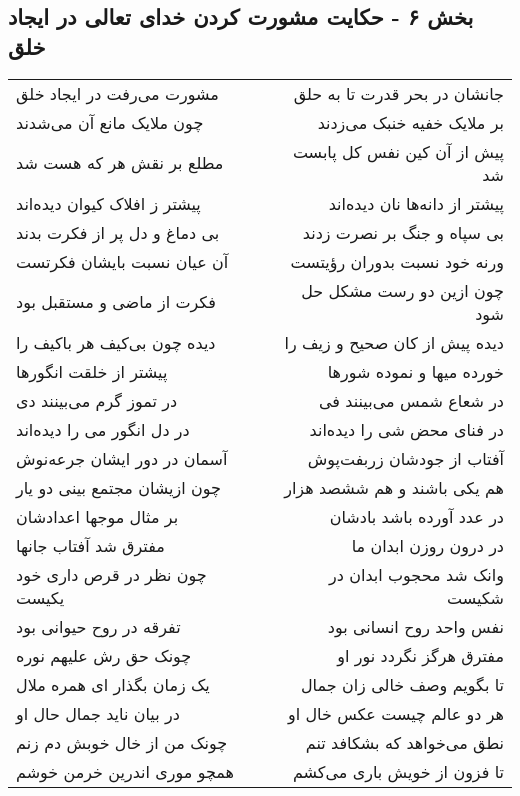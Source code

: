 \begin{center}
\section*{بخش ۶ - حکایت مشورت کردن خدای تعالی  در ایجاد خلق}
\label{sec:sh006}
\begin{longtable}{l p{0.5cm} r}
مشورت می‌رفت در ایجاد خلق
&&
جانشان در بحر قدرت تا به حلق
\\
چون ملایک مانع آن می‌شدند
&&
بر ملایک خفیه خنبک می‌زدند
\\
مطلع بر نقش هر که هست شد
&&
پیش از آن کین نفس کل پابست شد
\\
پیشتر ز افلاک کیوان دیده‌اند
&&
پیشتر از دانه‌ها نان دیده‌اند
\\
بی دماغ و دل پر از فکرت بدند
&&
بی سپاه و جنگ بر نصرت زدند
\\
آن عیان نسبت بایشان فکرتست
&&
ورنه خود نسبت بدوران رؤیتست
\\
فکرت از ماضی و مستقبل بود
&&
چون ازین دو رست مشکل حل شود
\\
دیده چون بی‌کیف هر باکیف را
&&
دیده پیش از کان صحیح و زیف را
\\
پیشتر از خلقت انگورها
&&
خورده میها و نموده شورها
\\
در تموز گرم می‌بینند دی
&&
در شعاع شمس می‌بینند فی
\\
در دل انگور می را دیده‌اند
&&
در فنای محض شی را دیده‌اند
\\
آسمان در دور ایشان جرعه‌نوش
&&
آفتاب از جودشان زربفت‌پوش
\\
چون ازیشان مجتمع بینی دو یار
&&
هم یکی باشند و هم ششصد هزار
\\
بر مثال موجها اعدادشان
&&
در عدد آورده باشد بادشان
\\
مفترق شد آفتاب جانها
&&
در درون روزن ابدان ما
\\
چون نظر در قرص داری خود یکیست
&&
وانک شد محجوب ابدان در شکیست
\\
تفرقه در روح حیوانی بود
&&
نفس واحد روح انسانی بود
\\
چونک حق رش علیهم نوره
&&
مفترق هرگز نگردد نور او
\\
یک زمان بگذار ای همره ملال
&&
تا بگویم وصف خالی زان جمال
\\
در بیان ناید جمال حال او
&&
هر دو عالم چیست عکس خال او
\\
چونک من از خال خوبش دم زنم
&&
نطق می‌خواهد که بشکافد تنم
\\
همچو موری اندرین خرمن خوشم
&&
تا فزون از خویش باری می‌کشم
\\
\end{longtable}
\end{center}
